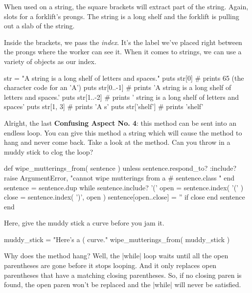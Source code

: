 \documentclass[12pt,twoside]{report}
\begin{document}
When used on a string, the square brackets will extract part of the
string.  Again, slots for a forklift's prongs.  The string is a long
shelf and the forklift is pulling out a slab of the string.

Inside the brackets, we pass the {\em index}.  It's the label we've
placed right between the prongs where the worker can see it.  When it
comes to strings, we can use a variety of objects as our index.


\begin{rubycode}

 str = "A string is a long shelf of letters and spaces."
 puts str[0]       # prints 65 (the character code for an 'A')
 puts str[0..-1]   # prints 'A string is a long shelf of letters and spaces.'
 puts str[1..-2]   # prints ' string is a long shelf of letters and spaces'
 puts str[1, 3]    # prints 'A s'
 puts str['shelf'] # prints 'shelf'

\end{rubycode}


Alright, the last {\bf Confusing Aspect No. 4}: this method can be
sent into an endless loop. You can give this method a string which
will cause the method to hang and never come back. Take a look at the
method.  Can you throw in a muddy stick to clog the loop?


\begin{rubycode}

 def wipe_mutterings_from( sentence )
   unless sentence.respond_to? :include?
     raise ArgumentError,
       "cannot wipe mutterings from a #{ sentence.class }"
   end
   sentence = sentence.dup
   while sentence.include? '('
     open = sentence.index( '(' )
     close = sentence.index( ')', open )
     sentence[open..close] = '' if close
   end
   sentence
 end

\end{rubycode}


Here, give the muddy stick a curve before you jam it.


\begin{rubycode}

 muddy_stick = "Here's a ( curve."
 wipe_mutterings_from( muddy_stick )

\end{rubycode}


Why does the method hang?  Well, the
\rubyinline|while| loop waits until all the open
parentheses are gone before it stops looping.  And it only replaces
open parentheses that have a matching closing parentheses.  So, if no
closing paren is found, the open paren won't be replaced and the
\rubyinline|while| will never be satisfied.
\end{document}
